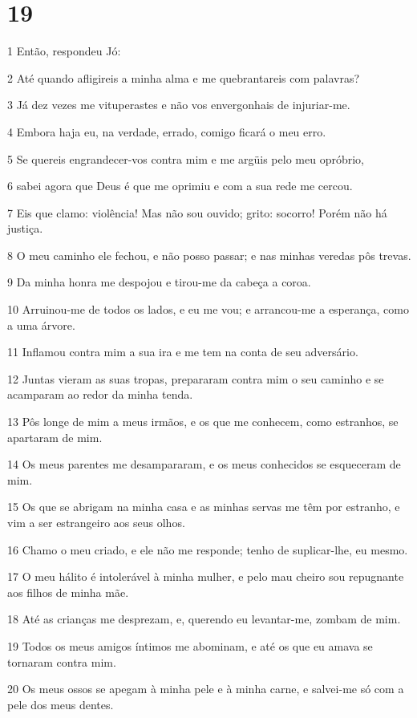 \chapter{19}

\par 1 Então, respondeu Jó:
\par 2 Até quando afligireis a minha alma e me quebrantareis com palavras?
\par 3 Já dez vezes me vituperastes e não vos envergonhais de injuriar-me.
\par 4 Embora haja eu, na verdade, errado, comigo ficará o meu erro.
\par 5 Se quereis engrandecer-vos contra mim e me argüis pelo meu opróbrio,
\par 6 sabei agora que Deus é que me oprimiu e com a sua rede me cercou.
\par 7 Eis que clamo: violência! Mas não sou ouvido; grito: socorro! Porém não há justiça.
\par 8 O meu caminho ele fechou, e não posso passar; e nas minhas veredas pôs trevas.
\par 9 Da minha honra me despojou e tirou-me da cabeça a coroa.
\par 10 Arruinou-me de todos os lados, e eu me vou; e arrancou-me a esperança, como a uma árvore.
\par 11 Inflamou contra mim a sua ira e me tem na conta de seu adversário.
\par 12 Juntas vieram as suas tropas, prepararam contra mim o seu caminho e se acamparam ao redor da minha tenda.
\par 13 Pôs longe de mim a meus irmãos, e os que me conhecem, como estranhos, se apartaram de mim.
\par 14 Os meus parentes me desampararam, e os meus conhecidos se esqueceram de mim.
\par 15 Os que se abrigam na minha casa e as minhas servas me têm por estranho, e vim a ser estrangeiro aos seus olhos.
\par 16 Chamo o meu criado, e ele não me responde; tenho de suplicar-lhe, eu mesmo.
\par 17 O meu hálito é intolerável à minha mulher, e pelo mau cheiro sou repugnante aos filhos de minha mãe.
\par 18 Até as crianças me desprezam, e, querendo eu levantar-me, zombam de mim.
\par 19 Todos os meus amigos íntimos me abominam, e até os que eu amava se tornaram contra mim.
\par 20 Os meus ossos se apegam à minha pele e à minha carne, e salvei-me só com a pele dos meus dentes.

